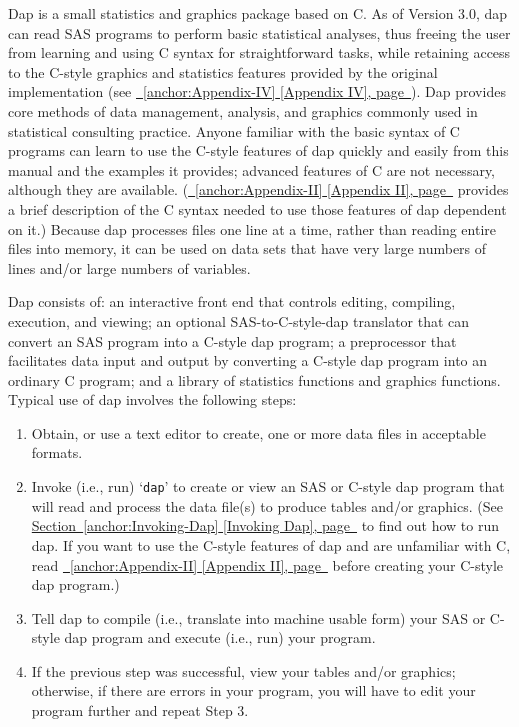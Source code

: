 \documentclass{book}
\renewcommand{\_}{\Texinfounderscore\discretionary{}{}{}}
\begin{document}
Dap is a small statistics and graphics package based on C.
As of Version 3.0, dap can read SAS programs to perform basic statistical
analyses, thus freeing the user from learning and using C syntax
for straightforward tasks,
while retaining access to the C-style graphics and statistics
features provided by the original implementation (see \hyperref[anchor:Appendix-IV]{\chaptername~\ref*{anchor:Appendix-IV} [Appendix IV], page~\pageref*{anchor:Appendix-IV}}).
Dap provides core methods of data management,
analysis, and graphics commonly used in statistical
consulting practice.
Anyone familiar with the basic syntax of C
%
%
programs can learn to use the C-style features of
dap quickly and easily from this manual and the examples it provides;
advanced features of C are not necessary,
although they are available.
(\hyperref[anchor:Appendix-II]{\chaptername~\ref*{anchor:Appendix-II} [Appendix II], page~\pageref*{anchor:Appendix-II}} provides a brief description of the C syntax needed to use
those features of dap dependent on it.)
Because dap processes files one line at a time, rather than reading entire files
into memory, it can be used on data sets that have very large numbers of lines
and/or large numbers of variables.

Dap consists of: an interactive front end that
controls editing, compiling, execution, and viewing;
an optional SAS-to-C-style-dap translator that can convert an SAS program into
a C-style dap program;
a preprocessor that facilitates data input and output by
converting a C-style dap program into an ordinary C program; and a library of
statistics functions and graphics functions.
Typical use of dap involves the following steps:

\begin{enumerate}[start=1]
\item Obtain, or use a text editor to create, one or more data files in acceptable
formats.
\item Invoke (i.e., run) `\texttt{dap}' to create or view an SAS or C-style
dap program that will read and process the data file(s) to
produce tables and/or graphics.
(See \hyperref[anchor:Invoking-Dap]{Section~\ref*{anchor:Invoking-Dap} [Invoking Dap], page~\pageref*{anchor:Invoking-Dap}} to find out how to run dap.
If you want to use the C-style features of dap and
are unfamiliar with C, read \hyperref[anchor:Appendix-II]{\chaptername~\ref*{anchor:Appendix-II} [Appendix II], page~\pageref*{anchor:Appendix-II}} before creating
your C-style dap program.)
\item Tell dap to compile (i.e., translate into machine usable form) your SAS
or C-style dap program and execute (i.e., run) your program.
\item If the previous step was successful, view your tables and/or
graphics; otherwise, if there are errors in your program, you will have to edit your program
further and repeat Step 3.
\end{enumerate}
\end{document}
